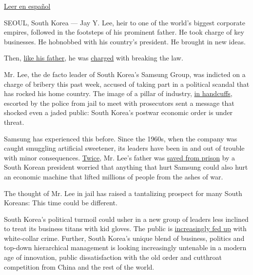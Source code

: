 \href{https://www.nytimes.com/es/2017/03/09/el-escandalo-de-samsung-amenaza-la-narrativa-de-exito-de-corea-del-sur/}{Leer
en español}

SEOUL, South Korea --- Jay Y. Lee, heir to one of the world's biggest
corporate empires, followed in the footsteps of his prominent father. He
took charge of key businesses. He hobnobbed with his country's
president. He brought in new ideas.

Then,
\href{http://www.nytimes.com/2008/04/17/business/worldbusiness/17iht-samsung.4.12107507.html}{like
his father}, he was
\href{https://www.nytimes.com/2017/02/28/world/asia/lee-jae-yong-samsung.html}{charged}
with breaking the law.

Mr. Lee, the de facto leader of South Korea's Samsung Group, was
indicted on a charge of bribery this past week, accused of taking part
in a political scandal that has rocked his home country. The image of a
pillar of industry,
\href{https://www.yahoo.com/news/arrested-samsung-heir-appears-handcuffed-questioning-083230348.html}{in
handcuffs}, escorted by the police from jail to meet with prosecutors
sent a message that shocked even a jaded public: South Korea's postwar
economic order is under threat.

Samsung has experienced this before. Since the 1960s, when the company
was caught smuggling artificial sweetener, its leaders have been in and
out of trouble with minor consequences.
\href{http://www.nytimes.com/1996/08/27/world/death-sentence-for-ex-president-chun-a-landmark-for-korea.html}{Twice},
Mr. Lee's father was
\href{http://www.nytimes.com/2009/12/30/business/global/30samsung.html}{saved
from prison} by a South Korean president worried that anything that hurt
Samsung could also hurt an economic machine that lifted millions of
people from the ashes of war.

The thought of Mr. Lee in jail has raised a tantalizing prospect for
many South Koreans: This time could be different.

South Korea's political turmoil could usher in a new group of leaders
less inclined to treat its business titans with kid gloves. The public
is
\href{https://www.nytimes.com/2016/07/05/business/dealbook/south-korea-targets-executives-pressed-by-an-angry-public.html}{increasingly
fed up} with white-collar crime. Further, South Korea's unique blend of
business, politics and top-down hierarchical management is looking
increasingly untenable in a modern age of innovation, public
dissatisfaction with the old order and cutthroat competition from China
and the rest of the world.

